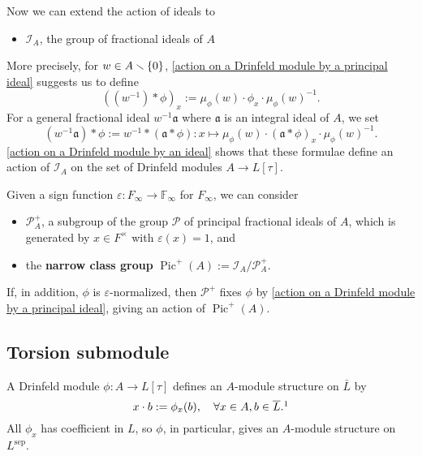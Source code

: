 \documentclass{article}
\newcommand{\F}{\mathbb{F}}
\newcommand{\sep}{\mathrm{sep}}
\DeclareMathOperator{\pic}{Pic}
\begin{document}

Now we can extend the action of ideals to
\begin{itemize}
    \item   $\mathcal{I}_A$, the group of fractional ideals of $A$
\end{itemize}
More precisely,
for $w\in A\smallsetminus \{0\}$,
\cref{action on a Drinfeld module by a principal ideal} suggests us to define
\[\left( (w^{-1})*\phi \right)_x := \mu_\phi(w)\cdot\phi_x\cdot \mu_{\phi}(w)^{-1}.\]
For a general fractional ideal $w^{-1}\mathfrak{a}$
where $\mathfrak{a}$ is an integral ideal of $A$,
we set \[(w^{-1}\mathfrak{a}) * \phi := w^{-1} * (\mathfrak{a} * \phi) : x\mapsto \mu_\phi(w)\cdot (\mathfrak{a} * \phi)_x\cdot \mu_\phi(w)^{-1}.\]
\cref{action on a Drinfeld module by an ideal} shows that these formulae define an action of $\mathcal{I}_A$
on the set of Drinfeld modules $A\to L[\tau]$.


Given a sign function $\varepsilon : F_\infty\to\F_\infty$ for $F_\infty$,
we can consider \begin{itemize}

    \item $\mathcal{P}^+_A$, a subgroup of the group $\mathcal{P}$ of principal fractional ideals of $A$, which is generated by $x\in F^\times$ with $\varepsilon(x) = 1$, and
    \item the \textbf{narrow class group} $\pic^+(A) := \mathcal{I}_A/\mathcal{P}^+_A$.
\end{itemize}
If, in addition, $\phi$ is $\varepsilon$-normalized,
then $\mathcal{P}^+$ fixes $\phi$ by \cref{action on a Drinfeld module by a principal ideal},
giving an action of $\pic^+(A)$.

\subsection{Torsion submodule}
A Drinfeld module $\phi : A\to L[\tau]$
defines an $A$-module structure on $\bar L$ by\[x\cdot b := \phi_x(b),\quad\forall x\in A, b\in\bar L.\footnotemark\]
All $\phi_x$ has coefficient in $L$, so $\phi$, in particular, gives an $A$-module structure on $L^\sep$.
\end{document}
